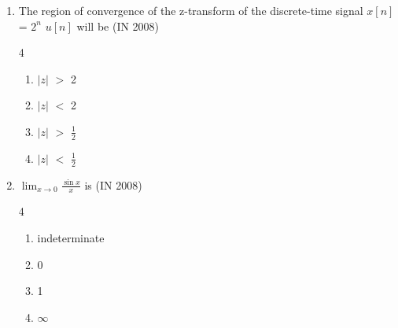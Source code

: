 \begin{enumerate}[label=\thesubsection.\arabic*,ref=\thesubsection.\theenumi]
\item The region of convergence of the z-transform of the discrete-time signal $x[n]$ = $2^{n}$ $u[n]$ will be  \hfill{(IN 2008)}
\begin{multicols}{4}
          \begin{enumerate} 
              \item  \( |z| \) $>$ 2
              \item  \( |z| \) $<$ 2
              \item  \( |z| \) $>$ $\frac{1}{2}$
              \item  \( |z| \) $<$ $\frac{1}{2}$
           \end{enumerate}
           \end{multicols}
    \item $\lim_{x \to 0} \frac{\sin x}{x}$ is \hfill{(IN 2008)}
    \begin{multicols}{4}
    \begin{enumerate} 
        \item indeterminate
        \item  0
        \item  1
        \item $\infty$
    \end{enumerate}
    \end{multicols}


\end{enumerate}

